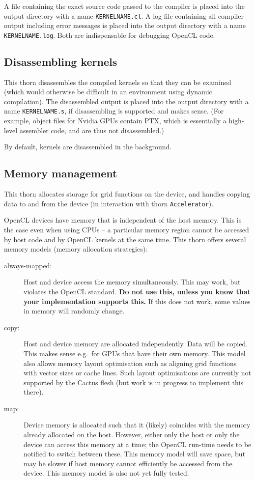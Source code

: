 A file containing the exact source code passed to the compiler is
placed into the output directory with a name \texttt{KERNELNAME.cl}. A
log file containing all compiler output including error messages is
placed into the output directory with a name \texttt{KERNELNAME.log}.
Both are indispensable for debugging OpenCL code.

\subsection{Disassembling kernels}

This thorn disassembles the compiled kernels so that they can be
examined (which would otherwise be difficult in an environment using
dynamic compilation). The disassembled output is placed into the
output directory with a name \texttt{KERNELNAME.s}, if disassembling
is supported and makes sense. (For example, object files for Nvidia
GPUs contain PTX, which is essentially a high-level assembler code,
and are thus not disassembled.)

By default, kernels are disassembled in the background.

\subsection{Memory management}

This thorn allocates storage for grid functions on the device, and
handles copying data to and from the device (in interaction with thorn
\texttt{Accelerator}).

OpenCL devices have memory that is independent of the host memory.
This is the case even when using CPUs -- a particular memory region
cannot be accessed by host code and by OpenCL kernels at the same
time. This thorn offers several memory models (memory allocation
strategies):
\begin{description}
\item[always-mapped:] Host and device access the memory
  simultaneously. This may work, but violates the OpenCL standard.
  \textbf{Do not use this, unless you know that your implementation
    supports this.} If this does not work, some values in memory will
  randomly change.
\item[copy:] Host and device memory are allocated independently. Data
  will be copied. This makes sense e.g.\ for GPUs that have their own
  memory. This model also allows memory layout optimisation such as
  aligning grid functions with vector sizes or cache lines. Such
  layout optimisations are currently not supported by the Cactus flesh
  (but work is in progress to implement this there).
\item[map:] Device memory is allocated such that it (likely) coincides
  with the memory already allocated on the host. However, either only
  the host or only the device can access this memory at a time; the
  OpenCL run-time needs to be notified to switch between these. This
  memory model will save space, but may be slower if host memory
  cannot efficiently be accessed from the device. This memory model is
  also not yet fully tested.
\end{description}

